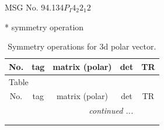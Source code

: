 \documentclass[fleqn,8pt]{jsarticle}
\begin{document}
\setcounter{MaxMatrixCols}{32}

\renewcommand{\tablename}{Table~}
\renewcommand{\figurename}{Figure~}
\begin{center}
\LARGE
MSG No. 94.134\quad$P_{I}4_{2}2_{1}2$
\end{center}
* symmetry operation
\renewcommand{\arraystretch}{1.3}
\begin{longtable}{ccccc}
\caption{Symmetry operations for 3d polar vector.}
 \\
 \hline \hline
No. & tag & matrix (polar) & det & TR \\ \hline \endfirsthead

\multicolumn{4}{l}{\tablename\ \thetable{}} \\
 \hline \hline
No. & tag & matrix (polar) & det & TR \\ \hline \endhead

 \hline \hline
\multicolumn{4}{r}{\footnotesize\it continued ...} \\ \endfoot

 \hline \hline
\multicolumn{4}{r}{} \\ \endlastfoot


\end{longtable}
\end{document}
